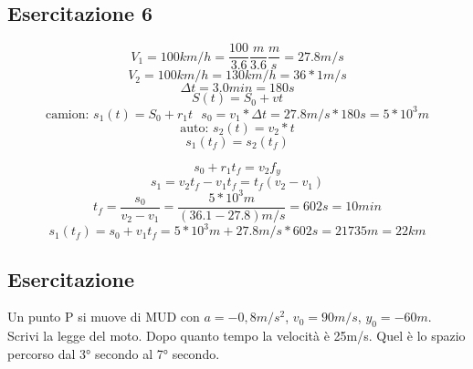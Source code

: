 \subsection{Esercitazione 6}
	\begin{equation*}
		V_1=100km/h=\frac{100}{3.6}\frac{m}{3.6}\frac{m}{s}=27.8m/s
	\end{equation*}
	\begin{equation*}
		V_2=100km/h=130km/h=36*1m/s
	\end{equation*}
	\begin{equation*}
		\Delta t=3.0min=180s
	\end{equation*}
	\begin{equation*}
		S(t)=S_0+vt
	\end{equation*}
	\begin{equation*}
		\text{camion: } s_1(t)=S_0+r_1t \text{ } s_0=v_1*\Delta
		t=27.8m/s*180s=5*10^3m
	\end{equation*}
	\begin{equation*}
		\text{auto: } s_2(t)=v_2*t
	\end{equation*}
	\begin{equation*}
		s_1(t_f)=s_2(t_f)
	\end{equation*}
\begin{multicols}{2}
	\begin{equation*}
		s_0+r_1t_f=v_2f_y
	\end{equation*}
	\begin{equation*}
		s_1=v_2t_f-v_1t_f=t_f(v_2-v_1)
	\end{equation*}
	\begin{equation*}
		\boxed{t_f=\frac{s_0}{v_2-v_1}}=\frac{5*10^3m}{(36.1-27.8)m/s}=602s=10min
	\end{equation*}
	\begin{equation*}
		s_1(t_f)=s_0+v_1t_f=5*10^3m+27.8m/s*602s=21735m=22km
	\end{equation*}

\end{multicols}
\subsection{Esercitazione}
Un punto P si muove di MUD con $a=-0,8m/s^2$, $v_0=90m/s$, $y_0=-60m$. Scrivi
la legge del moto. Dopo quanto tempo la velocità è 25m/s. Quel è lo spazio
percorso dal 3° secondo al 7° secondo.
